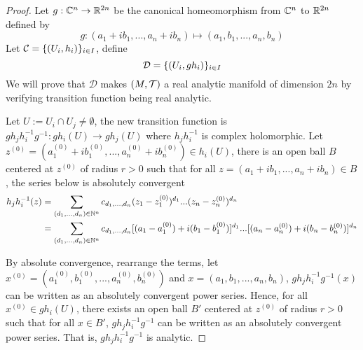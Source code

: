 \documentclass{article}
\begin{document}
\begin{proof}
    Let $g: \mathbb{C}^n \to \mathbb{R}^{2n}$ be the canonical homeomorphism from $\mathbb{C}^n$ to $\mathbb{R}^{2n}$ defined by
    $$
        g: (a_1 + ib_1, ..., a_n + ib_n) \mapsto (a_1, b_1, ..., a_n, b_n)
    $$
    Let $\mathcal{C} = \{(U_i, h_i)\}_{i \in I}$, define 
    $$
        \mathcal{D} = \{(U_i, g h_i)\}_{i \in I}
    $$
    We will prove that $\mathcal{D}$ makes $(M, \mathcal{T})$ a real analytic manifold of dimension $2n$ by verifying transition function being real analytic.

    Let $U := U_i \cap U_j \neq \emptyset$, the new transition function is $g h_j h^{-1}_i g^{-1}: gh_i(U) \to gh_j(U)$ where $h_j h^{-1}_i$ is complex holomorphic. Let $z^{(0)} = (a^{(0)}_1 + i b^{(0)}_1, ..., a^{(0)}_n + i b^{(0)}_n) \in h_i(U)$, there is an open ball $B$ centered at $z^{(0)}$ of radius $r > 0$ such that for all $z = (a_1 +ib_1, ..., a_n + ib_n) \in B$, the series below is absolutely convergent
    \begin{align*}
        h_j h^{-1}_i(z)
        &= \sum_{(d_1, ..., d_n) \in \mathbb{N}^n} c_{d_1, ..., d_n} (z_1 - z^{(0)}_1)^{d_1} ... (z_n - z^{(0)}_n)^{d_n} \\
        &= \sum_{(d_1, ..., d_n) \in \mathbb{N}^n} c_{d_1, ..., d_n} [(a_1 - a^{(0)}_1) + i (b_1 - b^{(0)}_1)]^{d_1} ... [(a_n - a^{(0)}_n) + i (b_n - b^{(0)}_n)]^{d_n}
    \end{align*}

    By absolute convergence, rearrange the terms, let $x^{(0)} = (a^{(0)}_1, b^{(0)}_1, ..., a^{(0)}_n, b^{(0)}_n)$ and $x = (a_1, b_1, ..., a_n, b_n)$,
    $g h_j h^{-1}_i g^{-1} (x)$ can be written as an absolutely convergent power series. Hence, for all $x^{(0)} \in g h_i(U)$, there exists an open ball $B'$ centered at $z^{(0)}$ of radius $r > 0$ such that for all $x \in B'$, $g h_j h^{-1}_i g^{-1}$ can be written as an absolutely convergent power series. That is, $g h_j h^{-1}_i g^{-1}$ is analytic.

    
    
\end{proof}
\end{document}
